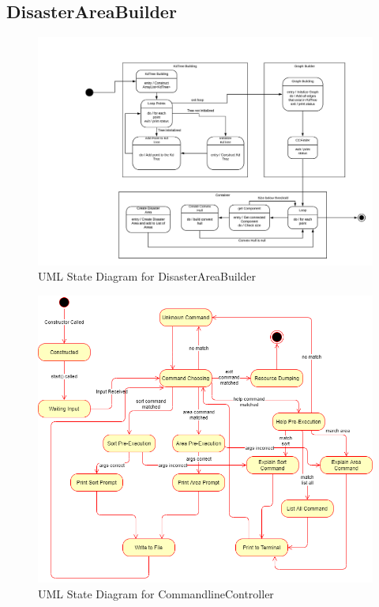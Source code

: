 \documentclass[12pt]{article}
\begin{document}
\subsection*{DisasterAreaBuilder}  
\newpage
\begin{figure}
            \includegraphics[scale=0.5]{State_Machine_DisasterAreaBuilder.jpeg}
            \caption{UML State Diagram for DisasterAreaBuilder}
            \label{fig:state_one}
\end{figure}
\begin{figure}
            \includegraphics[scale=0.5]{State_Diagram_CLC.png}
            \caption{UML State Diagram for CommandlineController}
            \label{fig:state_two}
\end{figure}

\normalsize
\end{document}
